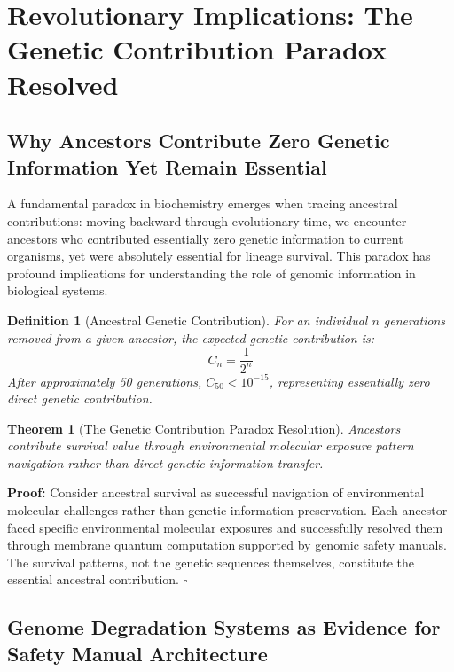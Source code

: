 \documentclass[12pt,a4paper]{article}
\newtheorem{theorem}{Theorem}
\newtheorem{definition}{Definition}
\begin{document}
\section{Revolutionary Implications: The Genetic Contribution Paradox Resolved}

\subsection{Why Ancestors Contribute Zero Genetic Information Yet Remain Essential}

A fundamental paradox in biochemistry emerges when tracing ancestral contributions: moving backward through evolutionary time, we encounter ancestors who contributed essentially zero genetic information to current organisms, yet were absolutely essential for lineage survival. This paradox has profound implications for understanding the role of genomic information in biological systems.

\begin{definition}[Ancestral Genetic Contribution]
For an individual $n$ generations removed from a given ancestor, the expected genetic contribution is:
\begin{equation}
C_n = \frac{1}{2^n}
\end{equation}
After approximately 50 generations, $C_{50} < 10^{-15}$, representing essentially zero direct genetic contribution.
\end{definition}

\begin{theorem}[The Genetic Contribution Paradox Resolution]
Ancestors contribute survival value through environmental molecular exposure pattern navigation rather than direct genetic information transfer.
\end{theorem}

\textbf{Proof:} Consider ancestral survival as successful navigation of environmental molecular challenges rather than genetic information preservation. Each ancestor faced specific environmental molecular exposures and successfully resolved them through membrane quantum computation supported by genomic safety manuals. The survival patterns, not the genetic sequences themselves, constitute the essential ancestral contribution. $\square$

\subsection{Genome Degradation Systems as Evidence for Safety Manual Architecture}
\end{document}
